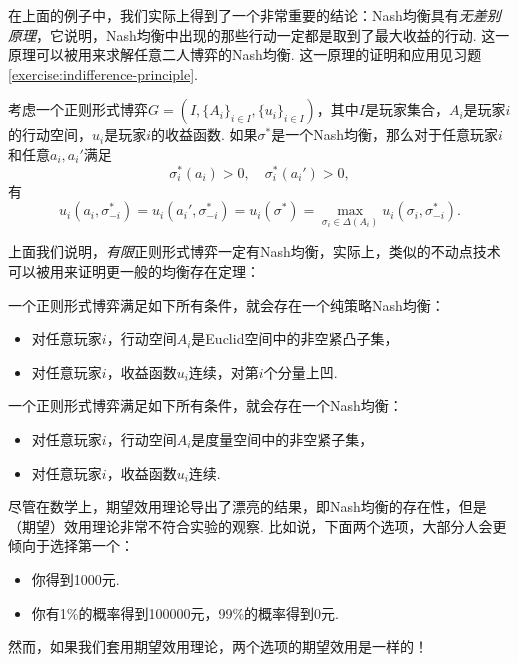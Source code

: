 在上面的例子中，我们实际上得到了一个非常重要的结论：Nash均衡具有\textit{无差别原理}，它说明，Nash均衡中出现的那些行动一定都是取到了最大收益的行动. 这一原理可以被用来求解任意二人博弈的Nash均衡. 这一原理的证明和应用见习题 \ref{exercise:indifference-principle}. 

\begin{theorem}[无差别原理]\label{thm:indifference-principle}
考虑一个正则形式博弈$G=(I,\{A_i\}_{i\in I},\{u_i\}_{i\in I})$，其中$I$是玩家集合，$A_i$是玩家$i$的行动空间，$u_i$是玩家$i$的收益函数. 如果$\sigma^*$是一个Nash均衡，那么对于任意玩家$i$和任意$a_i,a_i'$满足
\[\sigma^*_i(a_i)>0,\quad \sigma^*_i(a_i')>0,\]
有
\[u_i(a_i,\sigma^*_{-i})=u_i(a_i',\sigma^*_{-i})=u_i(\sigma^*)=\max_{\sigma_i\in\Delta(A_i)}u_i(\sigma_i,\sigma^*_{-i}).\]
\end{theorem}

上面我们说明，\textit{有限}正则形式博弈一定有Nash均衡，实际上，类似的不动点技术可以被用来证明更一般的均衡存在定理：

\begin{theorem}
    一个正则形式博弈满足如下所有条件，就会存在一个纯策略Nash均衡： 
    \begin{itemize}
        \item 对任意玩家$i$，行动空间$A_i$是Euclid空间中的非空紧凸子集，
        \item 对任意玩家$i$，收益函数$u_i$连续，对第$i$个分量上凹. 
    \end{itemize}
\end{theorem}

\begin{theorem}[Glicksberg定理]
    一个正则形式博弈满足如下所有条件，就会存在一个Nash均衡：
    \begin{itemize}
        \item 对任意玩家$i$，行动空间$A_i$是度量空间中的非空紧子集，
        \item 对任意玩家$i$，收益函数$u_i$连续. 
    \end{itemize}
\end{theorem}

尽管在数学上，期望效用理论导出了漂亮的结果，即Nash均衡的存在性，但是（期望）效用理论非常不符合实验的观察. 比如说，下面两个选项，大部分人会更倾向于选择第一个：
\begin{itemize}
    \item 你得到1000元.
    \item 你有1\%的概率得到100000元，99\%的概率得到0元.
\end{itemize}
然而，如果我们套用期望效用理论，两个选项的期望效用是一样的！

